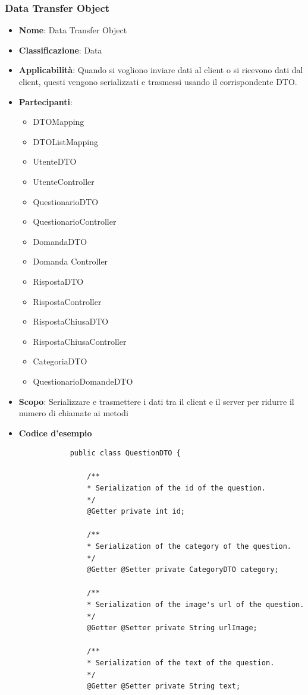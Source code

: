 \documentclass[12pt]{article}
\begin{document}
	\subsubsection{Data Transfer Object}
	\begin{itemize}
		\item \textbf{Nome}: Data Transfer Object
		\item \textbf{Classificazione}: Data
		\item \textbf{Applicabilità}: Quando si vogliono inviare dati al client o si ricevono dati dal client, questi vengono serializzati e trasmessi usando il corrispondente DTO.
		\item \textbf{Partecipanti}:
		\begin{itemize}
			\item DTOMapping
			\item DTOListMapping
			\item UtenteDTO
			\item UtenteController
			\item QuestionarioDTO
			\item QuestionarioController
			\item DomandaDTO
			\item Domanda Controller
			\item RispostaDTO
			\item RispostaController
			\item RispostaChiusaDTO
			\item RispostaChiusaController
			\item CategoriaDTO
			\item QuestionarioDomandeDTO
		\end{itemize}
		\item \textbf{Scopo}: Serializzare e trasmettere i dati tra il client e il server per ridurre il numero di chiamate ai metodi
		\item \textbf{Codice d'esempio}
		\begin{lstlisting}
			public class QuestionDTO {
				
				/**
				* Serialization of the id of the question.
				*/
				@Getter	private int id;
				
				/**
				* Serialization of the category of the question.
				*/
				@Getter	@Setter private CategoryDTO category;
				
				/**
				* Serialization of the image's url of the question.
				*/
				@Getter	@Setter private String urlImage;
				
				/**
				* Serialization of the text of the question.
				*/
				@Getter	@Setter private String text;
				

\end{lstlisting}
\end{itemize}
\end{document}
